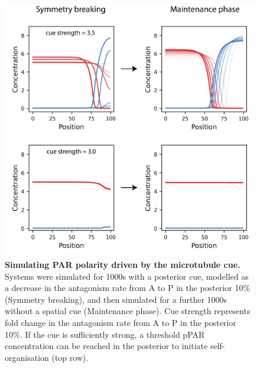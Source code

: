 \documentclass[12pt]{"report"}
\newcommand{\mycaption}[2]{\caption[#1]{\textbf{#1.} #2}}
\begin{document}

\begin{figure}
\includegraphics[scale=0.9]{no_flow_sb_model}
\centering
\mycaption{Simulating PAR polarity driven by the microtubule cue}{
Systems were simulated for 1000s with a posterior cue, modelled as a decrease in the antagonism rate from A to P in the posterior 10\% (Symmetry breaking), and then simulated for a further 1000s without a spatial cue (Maintenance phase). Cue strength represents fold change in the antagonism rate from A to P in the posterior 10\%. If the cue is sufficiently strong, a threshold pPAR concentration can be reached in the posterior to initiate self-organisation (top row).}
\label{fig:no_flow_sb_model}
\end{figure}

\end{document}
